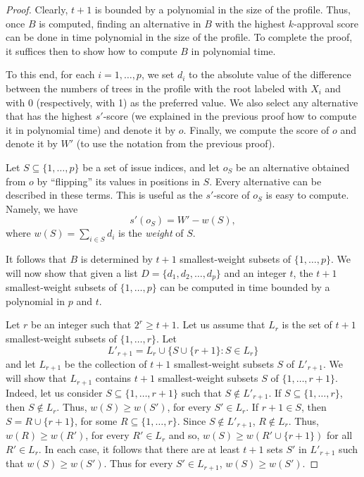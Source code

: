 \begin{proof}
Clearly, $t+1$ is bounded by a polynomial in the size of the profile. 
Thus, once $B$ is computed, finding an alternative in $B$ with the 
highest $k$-approval score can be done in time polynomial in the size 
of the profile. To complete the proof, it suffices then to show how to 
compute $B$ in polynomial time. 

To this end, for each $i=1,\ldots,p$, we set $d_i$ to the absolute value 
of the difference between the numbers of trees in the profile with the root 
labeled with $X_i$ and with 0 (respectively, with 1) as the preferred value. 
We also select any alternative that has the highest $s'$-score (we 
explained in the previous proof how to compute it in polynomial time)
and denote it by $o$. Finally, we compute the score of $o$ and denote it 
by $W'$ (to use the notation from the previous proof). 

Let $S\subseteq\{1,\ldots,p\}$ be a set of issue indices, and let $o_S$
be an alternative obtained from $o$ by ``flipping'' its values in 
positions in $S$. Every alternative can be described in these terms.
This is useful as the $s'$-score of $o_S$ is easy to compute. Namely, 
we have
\[
s'(o_S) = W' - w(S),
\]
where $w(S)=\sum_{i\in S} d_i$ is the \emph{weight} of $S$.

It follows that $B$ is determined by $t+1$ smallest-weight subsets 
of $\{1,\ldots,p\}$. We will now show that given a list $D=\{d_1,d_2,
\ldots,d_p\}$ and an integer $t$, the $t+1$ smallest-weight subsets 
of $\{1,\ldots,p\}$ can be computed in time bounded by a polynomial in
$p$ and $t$.  

Let $r$ be an integer such that $2^r\geq t+1$. Let us assume that $L_r$ is
the set of $t+1$ smallest-weight subsets of $\{1,\ldots,r\}$. Let 
\[
L'_{r+1}=L_r \cup \{S\cup \{r+1\}\colon S\in L_r\}
\]
and let $L_{r+1}$ be the collection of $t+1$ smallest-weight subsets $S$
of $L'_{r+1}$. We will show that $L_{r+1}$ contains $t+1$ smallest-weight 
subsets $S$ of $\{1,\ldots,r+1\}$. Indeed, let us consider $S\subseteq\{1,
\ldots,r+1\}$ such that $S\notin L'_{r+1}$. If $S\subseteq \{1,\ldots, r\}$,
then $S\notin L_r$. Thus, $w(S)\geq w(S')$, for every $S'\in L_r$.
If $r+1\in S$, then $S=R\cup\{r+1\}$, for some $R\subseteq \{1,\ldots,r\}$.
Since $S\notin L'_{r+1}$, $R\notin L_r$. Thus, $w(R)\geq w(R')$, for every
$R'\in L_r$ and so, $w(S)\geq w(R'\cup\{r+1\})$ for all $R'\in L_r$.
In each case, it follows that there are at least $t+1$ sets $S'$ in 
$L'_{r+1}$ such that $w(S)\geq w(S')$. Thus for every $S'\in L_{r+1}$, 
$w(S)\geq w(S')$. 


\end{proof}
